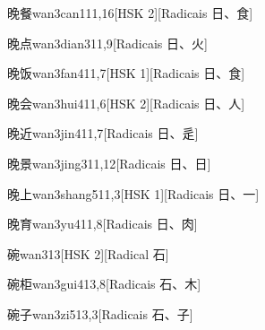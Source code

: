 \begin{entry}{晚餐}{wan3can1}{11,16}[HSK 2][Radicais ⽇、⾷]
\end{entry}

\begin{entry}{晚点}{wan3dian3}{11,9}[Radicais ⽇、⽕]
\end{entry}

\begin{entry}{晚饭}{wan3fan4}{11,7}[HSK 1][Radicais ⽇、⾷]
\end{entry}

\begin{entry}{晚会}{wan3hui4}{11,6}[HSK 2][Radicais ⽇、⼈]
\end{entry}

\begin{entry}{晚近}{wan3jin4}{11,7}[Radicais ⽇、⾡]
\end{entry}

\begin{entry}{晚景}{wan3jing3}{11,12}[Radicais ⽇、⽇]
\end{entry}

\begin{entry}{晚上}{wan3shang5}{11,3}[HSK 1][Radicais ⽇、⼀]
\end{entry}

\begin{entry}{晚育}{wan3yu4}{11,8}[Radicais ⽇、⾁]
\end{entry}

\begin{entry}{碗}{wan3}{13}[HSK 2][Radical ⽯]
\end{entry}

\begin{entry}{碗柜}{wan3gui4}{13,8}[Radicais ⽯、⽊]
\end{entry}

\begin{entry}{碗子}{wan3zi5}{13,3}[Radicais ⽯、⼦]
\end{entry}

